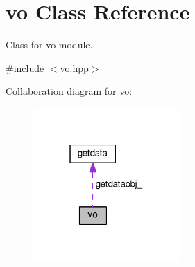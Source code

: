 \hypertarget{classvo}{}\section{vo Class Reference}
\label{classvo}


Class for vo module.  




{\ttfamily \#include $<$vo.\+hpp$>$}



Collaboration diagram for vo\+:
\nopagebreak
\begin{figure}[H]
\begin{center}
\leavevmode
\includegraphics[width=159pt]{classvo__coll__graph}
\end{center}
\end{figure}
